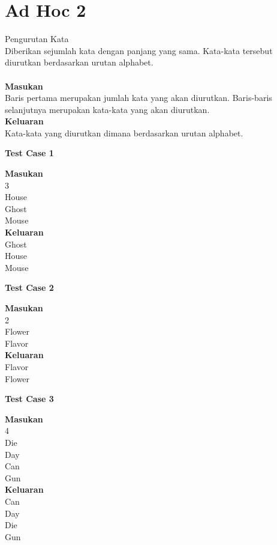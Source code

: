 \chapter{Ad Hoc 2}

\begin{permasalahan}{Pengurutan Kata}\\
Diberikan sejumlah kata dengan panjang yang sama. Kata-kata tersebut diurutkan berdasarkan urutan alphabet.\\
	\\
	\textbf{Masukan}\\
	Baris pertama merupakan jumlah kata yang akan diurutkan. Baris-baris selanjutnya merupakan kata-kata yang akan diurutkan.\\
	\textbf{Keluaran}\\
	Kata-kata yang diurutkan dimana berdasarkan urutan alphabet.\\
	\begin{center}
	\textbf{Test Case 1}\\
	\end{center}
	\textbf{Masukan}\\
	3\\
House\\
Ghost\\
Mouse\\

	\textbf{Keluaran}\\
	Ghost\\
House\\
Mouse\\
	\begin{center}
	\textbf{Test Case 2}\\
	\end{center}
	\textbf{Masukan}\\
	2\\
Flower\\
Flavor\\

	\textbf{Keluaran}\\
Flavor\\
Flower\\
	\begin{center}
	\textbf{Test Case 3}\\
	\end{center}
	\textbf{Masukan}\\
	4\\
Die\\
Day\\
Can\\
Gun\\

	\textbf{Keluaran}\\
Can\\
Day\\
Die\\
Gun\\
\end{permasalahan}

